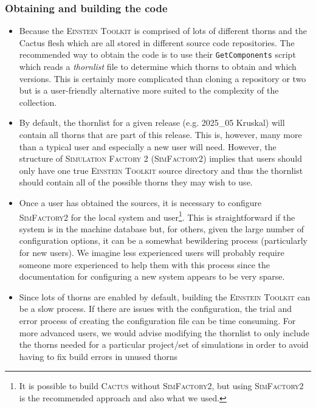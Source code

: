 \documentclass[12pt,a4paper]{article}
\numberwithin{figure}{subsection}
\newcommand{\einsteintoolkit}{\textsc{Einstein Toolkit}\xspace}
\begin{document}
\subsubsection{Obtaining and building the code}
\begin{itemize}
    \item Because the \einsteintoolkit is comprised of lots of different thorns
    and the Cactus flesh which are all stored in different source code
    repositories. The recommended way to obtain the code is to use their
    \texttt{GetComponents} script which reads a \emph{thornlist} file to
    determine which thorns to obtain and which versions. This is certainly more
    complicated than cloning a repository or two but is a user-friendly
    alternative more suited to the complexity of the collection.
    \item By default, the thornlist for a given release (e.g. 2025\_05 Kruskal)
    will contain all thorns that are part of this release. This is, however,
    many more than a typical user and especially a new user will need. However,
    the structure of \textsc{Simulation Factory 2} (\textsc{SimFactory2})
    implies that users should only have one true \einsteintoolkit source
    directory and thus the thornlist should contain all of the possible thorns
    they may wish to use.
    \item Once a user has obtained the sources, it is necessary to configure
    \textsc{SimFactory2} for the local system and user\footnote{It is possible to
    build \textsc{Cactus} without \textsc{SimFactory2}, but using
    \textsc{SimFactory2} is the recommended approach and also what we used.}.
    This is straightforward if the system is in the machine database but, for
    others, given the large number of configuration options, it can be a
    somewhat bewildering process (particularly for new users). We imagine less
    experienced users will probably require someone more experienced to help
    them with this process since the documentation for configuring a new system
    appears to be very sparse.
    \item Since lots of thorns are enabled by default, building the
    \einsteintoolkit can be a slow process. If there are issues with the
    configuration, the trial and error process of creating the configuration
    file can be time consuming. For more advanced users, we would advise modifying
    the thornlist to only include the thorns needed for a particular project/set
    of simulations in order to avoid having to fix build errors in unused thorns

\end{itemize}
\end{document}
